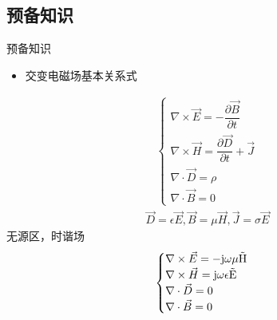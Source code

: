 \subsection{预备知识}
\begin{frame}{预备知识}
    \begin{itemize}
        \item 交变电磁场基本关系式
    \end{itemize}
    \begin{align*}
        \begin{cases}
            \nabla\times\vec{E}=-\dfrac{\partial \vec{B}}{\partial t}        \\
            \nabla\times\vec{H}=\dfrac{\partial \vec{D}}{\partial t}+\vec{J} \\
            \nabla\cdot\vec{D}=\rho                                          \\
            \nabla\cdot\vec{B}=0
        \end{cases}
    \end{align*}
    \begin{align*}
        \vec{D}=\epsilon\vec{E},\vec{B}=\mu\vec{H},\vec{J}=\sigma\vec{E}
    \end{align*}
    无源区，时谐场
    \begin{align*}
        \begin{cases}
            \nabla\times\vec{E}=-\rm{j}\omega\mu\vec{H}     \\
            \nabla\times\vec{H}=\rm{j}\omega\epsilon\vec{E} \\
            \nabla\cdot\vec{D}=0                            \\
            \nabla\cdot\vec{B}=0
        \end{cases}
    \end{align*}
\end{frame}

